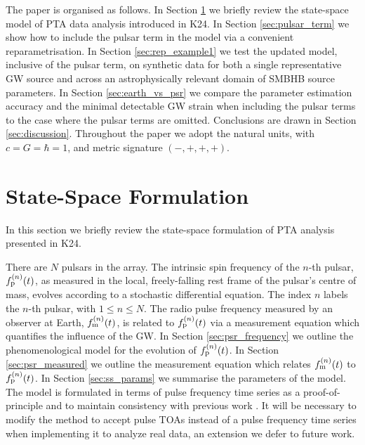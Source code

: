 \documentclass[fleqn,usenatbib,useAMS]{mnras}
\begin{document}
The paper is organised as follows. In Section \ref{sec:2} we briefly review the state-space model of PTA data analysis introduced in K24. In Section \ref{sec:pulsar_term} we show how to include the pulsar term in the model via a convenient reparametrisation. In Section \ref{sec:rep_example1} we test the updated model, inclusive of the pulsar term, on synthetic data for both a single representative GW source and across an astrophysically relevant domain of SMBHB source parameters. In Section \ref{sec:earth_vs_psr} we compare the parameter estimation accuracy and the minimal detectable GW strain when including the pulsar terms to the case where the pulsar terms are omitted. Conclusions are drawn in Section \ref{sec:discussion}. Throughout the paper we adopt the natural units, with $c = G = \hbar = 1$, and metric signature $(-,+,+,+)$. \newline 







\section{State-Space Formulation}\label{sec:2}
In this section we briefly review the state-space formulation of PTA analysis presented in K24. \newline 

There are $N$ pulsars in the array. The intrinsic spin frequency of the $n$-th pulsar, $f_{\rm p}^{(n)}(t)$, as measured in the local, freely-falling rest frame of the pulsar's centre of mass, evolves according to a stochastic differential equation. The index $n$ labels the $n$-th pulsar, with $1\leq n\leq N$. The radio pulse frequency measured by an observer at Earth, $f_{\rm m}^{(n)}(t)$, is related to $f_{\rm p}^{(n)}(t)$ via a measurement equation which quantifies the influence of the GW. In Section \ref{sec:psr_frequency} we outline the phenomenological model for the evolution of $f_{\rm p}^{(n)}(t)$. In Section \ref{sec:psr_measured} we outline the measurement equation which relates $f_{\rm m}^{(n)}(t)$ to $f_{\rm p}^{(n)}(t)$. In Section \ref{sec:ss_params} we summarise the parameters of the model. The model is formulated in terms of pulse frequency time series as a proof-of-principle and to maintain consistency with previous work \citep{Myers2021MNRAS.502.3113M,Meyers2021,KimpsonPTA}. It will be necessary to modify the method to accept pulse TOAs instead of a pulse frequency time series when implementing it to analyze real data, an extension we defer to future work. 
\end{document}
